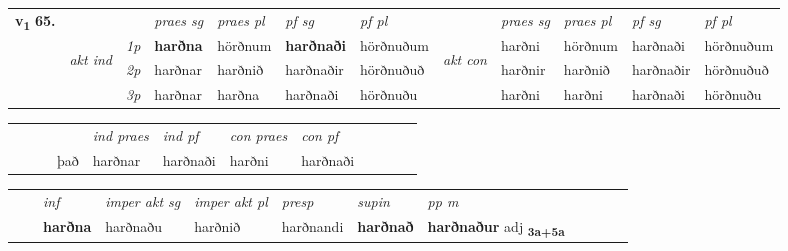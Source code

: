 \begin{tabular}{llllllllllll} \toprule
\multirow{4}{*}{{{\textbf{v{\textsubscript{1}}} \Large{\textbf{65.}}}}}  & &   &  \textit{praes sg}  & \textit{praes pl}  &\textit{ pf sg} & \textit{pf pl} &  &  \textit{praes sg}  & \textit{praes pl}  & \textit{pf sg} & \textit{pf pl } \\*
	\cmidrule{4-7} \cmidrule{9-12}
 & \multirow{3}{*}{\begin{turn}{90}\textit{akt ind}\end{turn}} & {\textit{1p}} & \textbf{harðna} & hörðnum    & \textbf{harðnaði} & hörðnuðum & \multirow{3}{*}{\begin{turn}{90}\textit{akt con}\end{turn}} &harðni & hörðnum & harðnaði & hörðnuðum\\*
& &  {\textit{2p}} &  harðnar  & harðnið   & harðnaðir & hörðnuðuð & & harðnir & harðnið & harðnaðir & hörðnuðuð \\*
& &  {\textit{3p}} & harðnar & harðna   & harðnaði & hörðnuðu & & harðni & harðni& harðnaði & hörðnuðu  \\*
\cmidrule{4-7} \cmidrule{9-12}
\end{tabular}


\begin{tabular}{llllllllllll}
 & &  & &  \textit{ind praes} & \textit{ind pf} & \textit{con praes} & \textit{con pf} \\*
&  & & það & harðnar & harðnaði & harðni & harðnaði \\*
\cmidrule{5-9}
\end{tabular}


\begin{tabular}{llllllllllll}
 & & \textit{inf} & \textit{imper akt sg} & \textit{imper akt pl}   & \textit{presp} & \textit{supin}  & \textit{pp m}     \\*
  & & \textbf{harðna} & harðnaðu  & harðnið   & harðnandi &  \textbf{harðnað}  & \textbf{harðnaður} adj \textbf{\textsubscript{3a+5a}} \\*
\cmidrule{1-12}
\end{tabular}



